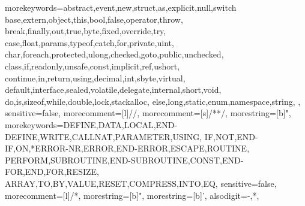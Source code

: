 \usepackage{floatflt}
\usepackage{float}

\usepackage{pdfpages}

\usepackage{listings}
\lstset{
    float=hbp,
    basicstyle=\footnotesize,
    columns=flexible,
    tabsize=2,
    frame=single,
    extendedchars=true,
    showspaces=false,
    showstringspaces=false,
    numbers=left,
    numberstyle=\tiny,
    breaklines=true,
    breakautoindent=true,
    captionpos=b,
    }
\usepackage{xcolor} 
  {morekeywords={abstract,event,new,struct,as,explicit,null,switch
		base,extern,object,this,bool,false,operator,throw,
		break,finally,out,true,byte,fixed,override,try,
		case,float,params,typeof,catch,for,private,uint,
		char,foreach,protected,ulong,checked,goto,public,unchecked,
		class,if,readonly,unsafe,const,implicit,ref,ushort,
		continue,in,return,using,decimal,int,sbyte,virtual,
		default,interface,sealed,volatile,delegate,internal,short,void,
		do,is,sizeof,while,double,lock,stackalloc,
		else,long,static,enum,namespace,string, },
	  sensitive=false,
	  morecomment=[l]{//},
	  morecomment=[s]{/*}{*/},
	  morestring=[b]",
}
  {morekeywords={DEFINE,DATA,LOCAL,END-DEFINE,WRITE,CALLNAT,PARAMETER,USING,%
               IF,NOT,END-IF,ON,*ERROR-NR,ERROR,END-ERROR,ESCAPE,ROUTINE,%
               PERFORM,SUBROUTINE,END-SUBROUTINE,CONST,END-FOR,END,FOR,RESIZE,%
               ARRAY,TO,BY,VALUE,RESET,COMPRESS,INTO,EQ},
	  sensitive=false,
	  morecomment=[l]{/*},
	  morestring=[b]",
	  morestring=[b]',
	  alsodigit={-,*},
}


